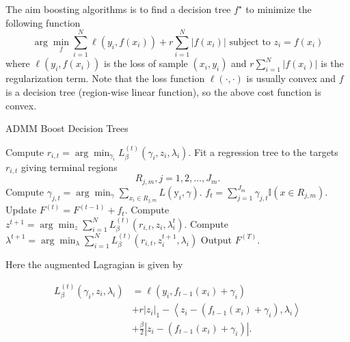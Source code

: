 \documentclass[UTF8]{article}
\begin{document}
The  aim boosting algorithms is to find a decision tree $f^{\star}$ to minimize the following function
 $$\arg\min_{f}\sum_{i=1}^{N}\ell(y_i, f(x_i))+r\sum_{i=1}^{N}|f(x_i)| \text{  subject to $z_i=f(x_i)$}$$
where $\ell(y_i, f(x_i))$ is the loss of sample $(x_i, y_i)$ and $r\sum_{i=1}^{N}|f(x_i)|$ is the regularization term.
Note that the loss function $\ell(\cdot, \cdot)$ is usually convex and $f$ is a decision tree (region-wise linear function), so the above cost function is convex.
\begin{algorithm}[h]
  \caption{ADMM Boost Decision Trees}
  \begin{algorithmic}[1]
  \STATE  Compute $r_{i,t}=\arg\min_{\gamma_i}L_{\beta}^{(t)}(\gamma_i, z_i, \lambda_i)$.
  \ENDFOR
  \STATE  Fit a regression tree to the targets $r_{i,t}$ giving terminal regions
     $$R_{j,m}, j = 1, 2,\dots , J_m. $$
  \STATE  Compute $\gamma_{j, t}=\arg\min_{\gamma}\sum_{x_i\in R_{j,m}}{L(\mathrm{y}_i, \gamma)}$.
  \ENDFOR
  \STATE $f_t={\sum}_{j=1}^{J_m}{\gamma}_{j, t} \mathbb{I}(x\in R_{j, m})$.
  \STATE Update $F^{(t)} = F^{(t-1)}+f_t$.
  \ENDFOR
  \STATE  Compute $z^{t+1}=\arg\min_{z} \sum_{i=1}^{N}L_{\beta}^{(t)}(r_{i,t},z_i,\lambda^{t}_i)$.
  \STATE  Compute $\lambda^{t+1}=\arg\min_{\lambda}\sum_{i=1}^{N} L_{\beta}^{(t)}(r_{i,t},z^{t+1}_i,\lambda_i)$
  \STATE  Output $F^{(T)}$.
  \end{algorithmic}
\end{algorithm}

Here the augmented Lagragian is given by

\begin{align}
L_{\beta}^{(t)}(\gamma_i, z_i, \lambda_i) \nonumber
& =\ell(y_i, f_{t-1}(x_i) + \gamma_i) \\ \nonumber
&+ r {|z_i|}_1 -\left<z_i-(f_{t-1}(x_i) + \gamma_i),\lambda_i\right>\\ \nonumber
&+ \frac{\beta}{2}{|z_i-(f_{t-1}(x_i) + \gamma_i)|}. \nonumber
\end{align}
\end{document}
